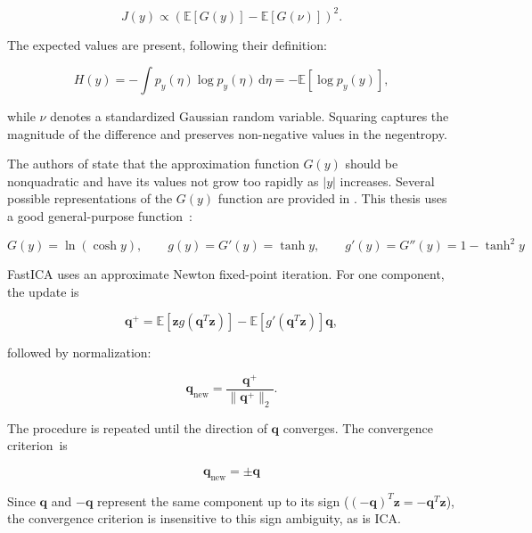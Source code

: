 \documentclass[english]{pwr_wmat_praca_dyplomowa}
\theoremstyle{definition}
\theoremstyle{remark}
\begin{document}
\begin{equation}
    J(y) \propto \left( \mathbb{E}[G(y)] - \mathbb{E}[G(\nu)]\right)^2.
\end{equation}

The expected values are present, following their definition:

\begin{equation}
    H(y) = -\int p_y(\eta) \log p_y(\eta)\,\mathrm{d}\eta = - \mathbb{E} \left[ \log p_y(y) \right],
\end{equation}

while $\nu$ denotes a standardized Gaussian random variable. Squaring captures the magnitude of the difference and preserves non-negative values in the negentropy. 

The authors of \cite{ica} state that the approximation function $G(y)$ should be nonquadratic and have its values not grow too rapidly as $|y|$ increases. Several possible representations of the $G(y)$ function are provided in \cite{ica}. This thesis uses a good general-purpose function~\cite{ica}:

\begin{equation}
    G(y) = \ln (\cosh y), \qquad g(y) = G'(y) = \tanh y, \qquad g'(y) = G''(y) = 1 - \tanh^2 y
\end{equation}

FastICA uses an approximate Newton fixed-point iteration. For one component, the update is \cite[Equation 8.43]{ica}

\begin{equation}
    \mathbf{q}^{+} = \mathbb{E} \left[ \mathbf{z} g \left( \mathbf{q}^T\mathbf{z} \right) \right]
    - \mathbb{E} \left[g' \left( \mathbf{q}^T\mathbf{z} \right)\right] \mathbf{q},
\end{equation}

followed by normalization:

\begin{equation}
    \mathbf{q}_{\mathrm{new}} = \frac{\mathbf{q}^{+}}{\|\mathbf{q}^{+}\|_2}.
\end{equation}

The procedure is repeated until the direction of $\mathbf{q}$ converges. The convergence criterion~is 

\begin{equation}
    \mathbf{q}_{\mathrm{new}} = \pm \mathbf{q}
\end{equation}

Since $\mathbf{q}$ and $-\mathbf{q}$ represent the same component up to its sign ($(-\mathbf{q})^T\mathbf{z} = -\mathbf{q}^T\mathbf{z}$), the convergence criterion is insensitive to this sign ambiguity, as is ICA.
\end{document}
